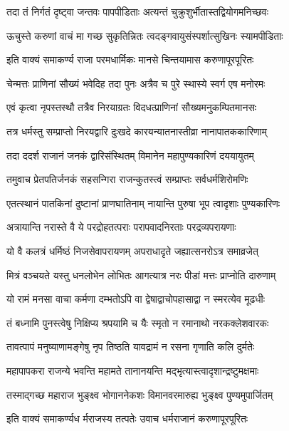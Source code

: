 \twolineshloka
{तदा तं निर्गतं दृष्ट्वा जन्तवः पापपीडिताः}
{अत्यन्तं चुक्रुशुर्भीतास्तद्वियोगमनिच्छवः}%

\twolineshloka
{ऊचुस्ते करुणां वाचं मा गच्छ सुकृतिन्नितः}
{त्वदङ्गवायुसंस्पर्शात्सुखिनः स्यामपीडिताः}%

\twolineshloka
{इति वाक्यं समाकर्ण्य राजा परमधार्मिकः}
{मानसे चिन्तयामास करुणापूरपूरितः}%

\twolineshloka
{चेन्मत्तः प्राणिनां सौख्यं भवेदिह तदा पुनः}
{अत्रैव च पुरे स्थास्ये स्वर्ग एष मनोरमः}%

\twolineshloka
{एवं कृत्वा नृपस्तस्थौ तत्रैव निरयाग्रतः}
{विदधत्प्राणिनां सौख्यमनुकम्पितमानसः}%

\twolineshloka
{तत्र धर्मस्तु सम्प्राप्तो निरयद्वारि दुःखदे}
{कारयन्यातनास्तीव्रा नानापातककारिणाम्}%

\twolineshloka
{तदा ददर्श राजानं जनकं द्वारिसंस्थितम्}
{विमानेन महापुण्यकारिणं दययायुतम्}%

\twolineshloka
{तमुवाच प्रेतपतिर्जनकं सहसन्गिरा}
{राजन्कुतस्त्वं सम्प्राप्तः सर्वधर्मशिरोमणिः}%

\twolineshloka
{एतत्स्थानं पातकिनां दुष्टानां प्राणघातिनाम्}
{नायान्ति पुरुषा भूप त्वादृशाः पुण्यकारिणः}%

\twolineshloka
{अत्रायान्ति नरास्ते वै ये परद्रोहतत्पराः}
{परापवादनिरताः परद्रव्यपरायणाः}%

\twolineshloka
{यो वै कलत्रं धर्मिष्ठं निजसेवापरायणम्}
{अपराधादृते जह्यात्सनरोऽत्र समाव्रजेत्}%

\twolineshloka
{मित्रं वञ्चयते यस्तु धनलोभेन लोभितः}
{आगत्यात्र नरः पीडां मत्तः प्राप्नोति दारुणाम्}%

\twolineshloka
{यो रामं मनसा वाचा कर्मणा दम्भतोऽपि वा}
{द्वेषाद्वाचोपहासाद्वा न स्मरत्येव मूढधीः}%

\twolineshloka
{तं बध्नामि पुनस्त्वेषु निक्षिप्य श्रपयामि च}
{यैः स्मृतो न रमानाथो नरकक्लेशवारकः}%

\twolineshloka
{तावत्पापं मनुष्याणामङ्गेषु नृप तिष्ठति}
{यावद्रामं न रसना गृणाति कलि दुर्मतेः}%

\twolineshloka
{महापापकरा राजन्ये भवन्ति महामते}
{तानानयन्ति मद्भृत्यास्त्वादृशान्द्रष्टुमक्षमाः}%

\twolineshloka
{तस्माद्गच्छ महाराज भुङ्क्ष्व भोगाननेकशः}
{विमानवरमारुह्य भुङ्क्ष्व पुण्यमुपार्जितम्}%

\twolineshloka
{इति वाक्यं समाकर्ण्यध र्मराजस्य तत्पतेः}
{उवाच धर्मराजानं करुणापूरपूरितः}%


